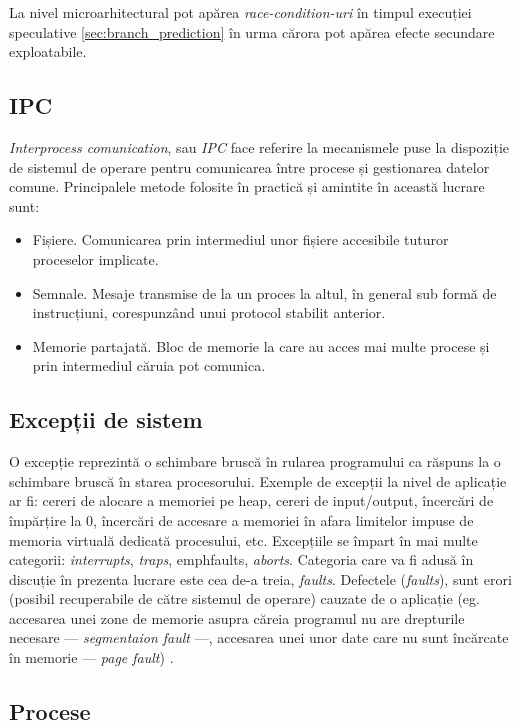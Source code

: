 La nivel microarhitectural pot apărea \emph{race-condition-uri} în timpul
execuției speculative \ref{sec:branch_prediction} în urma cărora pot apărea
efecte secundare exploatabile.

\subsection{IPC}

\emph{Interprocess comunication}, sau \emph{IPC} face referire la mecanismele
puse la dispoziție de sistemul de operare pentru comunicarea între procese și
gestionarea datelor comune. Principalele metode folosite în practică și amintite în
această lucrare sunt:
\begin{itemize}
  \setlength\itemsep{0em}
  \item Fișiere. Comunicarea prin intermediul unor fișiere accesibile tuturor
    proceselor implicate.
  \item Semnale. Mesaje transmise de la un proces la altul, în general sub
    formă de instrucțiuni, corespunzând unui protocol stabilit anterior.
  \item Memorie partajată. Bloc de memorie la care au acces mai multe procese
    și prin intermediul căruia pot comunica.
\end{itemize}

\subsection{Excepții de sistem}

O excepție reprezintă o schimbare bruscă în rularea programului ca răspuns la o
schimbare bruscă în starea procesorului. Exemple de excepții la nivel de
aplicație ar fi: cereri de alocare a memoriei pe heap, cereri de input/output,
încercări de împărțire la $0$, încercări de accesare a memoriei în afara
limitelor impuse de memoria virtuală dedicată procesului, etc. Excepțiile se
împart în mai multe categorii: \emph{interrupts}, \emph{traps}, emph{faults},
\emph{aborts}. Categoria care va fi adusă în discuție în prezenta lucrare este
cea de-a treia, \emph{faults}. Defectele (\emph{faults}), sunt erori (posibil
recuperabile de către sistemul de operare) cauzate de o aplicație (eg.
accesarea unei zone de memorie asupra căreia programul nu are drepturile
necesare --- \emph{segmentaion fault} ---, accesarea unei unor date care nu
sunt încărcate în memorie --- \emph{page fault}) \cite{exception_processes}.

\subsection{Procese}

